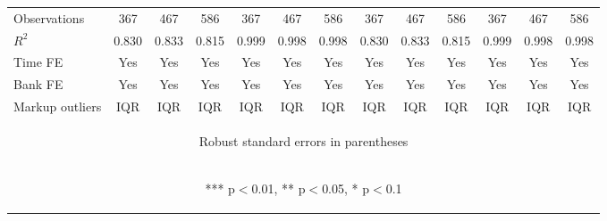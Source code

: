 \documentclass[]{article}
\begin{document}
\begin{center}
\begin{tabular}{lcccccccccccc}
Observations & 367 & 467 & 586 & 367 & 467 & 586 & 367 & 467 & 586 & 367 & 467 & 586 \\
$R^2$ & 0.830 & 0.833 & 0.815 & 0.999 & 0.998 & 0.998 & 0.830 & 0.833 & 0.815 & 0.999 & 0.998 & 0.998 \\
Time FE & Yes & Yes & Yes & Yes & Yes & Yes & Yes & Yes & Yes & Yes & Yes & Yes \\
Bank FE & Yes & Yes & Yes & Yes & Yes & Yes & Yes & Yes & Yes & Yes & Yes & Yes \\
 Markup outliers & IQR & IQR & IQR & IQR & IQR & IQR & IQR & IQR & IQR & IQR & IQR & IQR \\ \hline
\multicolumn{13}{c}{\begin{footnotesize} Robust standard errors in parentheses\end{footnotesize}} \\
\multicolumn{13}{c}{\begin{footnotesize} *** p$<$0.01, ** p$<$0.05, * p$<$0.1\end{footnotesize}} \\
\end{tabular}
\end{center}
\end{document}
